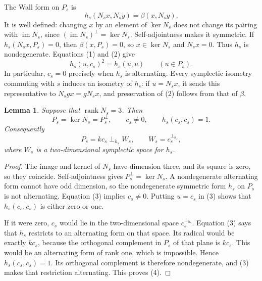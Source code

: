 \documentclass[11pt]{article}
\newtheorem{lemma}[theorem]{Lemma}
\newcommand{\im}{\operatorname{im}}
\begin{document}
The Wall form on \(P_s\) is
\[
        h_s(N_sx,N_sy)=\beta(x,N_sy).                     \tag{2}
\]
It is well defined: changing \(x\) by an element of \(\ker N_s\)
does not change its pairing with \(\im N_s\), since
\((\im N_s)^\perp=\ker N_s\). Self-adjointness makes it symmetric.
If \(h_s(N_sx,P_s)=0\), then
\(\beta(x,P_s)=0\), so \(x\in\ker N_s\) and \(N_sx=0\).
Thus \(h_s\) is nondegenerate.
Equations (1) and (2) give
\[
             h_s(u,c_s)^2=h_s(u,u)\qquad(u\in P_s).       \tag{3}
\]
In particular, \(c_s=0\) precisely when \(h_s\) is alternating.
Every symplectic isometry commuting with \(s\) induces an isometry
of \(h_s\): if \(u=N_sx\), it sends this representative to
\(N_sgx=gN_sx\), and preservation of (2) follows from that of
\(\beta\).

\begin{lemma}\label{lem:oddwall}
Suppose that \(\operatorname{rank}N_s=3\). Then
\[
 P_s=\ker N_s=P_s^\perp,\qquad
 c_s\ne0,\qquad h_s(c_s,c_s)=1.
\]
Consequently
\[
       P_s=kc_s\mathbin{\perp_{h_s}} W_s,\qquad
       W_s=c_s^{\perp_{h_s}},
                                                               \tag{4}
\]
where \(W_s\) is a two-dimensional symplectic space for \(h_s\).
\end{lemma}
\begin{proof}
The image and kernel of \(N_s\) have dimension three, and its square
is zero, so they coincide. Self-adjointness gives
\(P_s^\perp=\ker N_s\). A nondegenerate alternating form cannot
have odd dimension, so the nondegenerate symmetric form \(h_s\)
on \(P_s\) is not alternating. Equation (3) implies \(c_s\ne0\).
Putting \(u=c_s\) in (3) shows that \(h_s(c_s,c_s)\) is either
zero or one.

If it were zero, \(c_s\) would lie in the two-dimensional space
\(c_s^{\perp_{h_s}}\). Equation (3) says that \(h_s\) restricts
to an alternating form on that space. Its radical would be exactly
\(kc_s\), because the orthogonal complement in \(P_s\) of that
plane is \(kc_s\). This would be an alternating form of rank one,
which is impossible. Hence \(h_s(c_s,c_s)=1\).
Its orthogonal complement is therefore nondegenerate, and (3)
makes that restriction alternating. This proves (4).
\end{proof}
\end{document}
